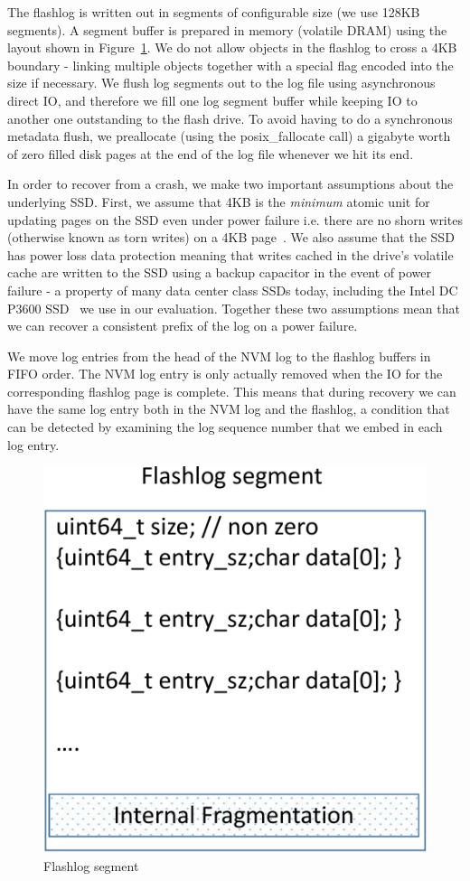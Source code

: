 \documentclass[pageno]{jpaper}
\begin{document}
The flashlog is written out in segments of configurable size (we use 128KB
segments). A segment buffer is prepared in memory (volatile DRAM) using the
layout shown in Figure~\ref{fig:flashlog_page}. We do not allow objects in the
flashlog to cross a 4KB boundary - linking multiple objects together with a
special flag encoded into the size if necessary. We flush log segments out to
the log file using asynchronous direct IO, and therefore we fill one log segment
buffer while keeping IO to another one outstanding to the flash drive. To avoid
having to do a synchronous metadata flush, we preallocate (using the
posix\_fallocate call) a gigabyte worth of zero filled disk pages at the end of
the log file whenever we hit its end.

In order to recover from a crash, we make two important assumptions about the
underlying SSD. First, we assume that 4KB is the \emph{minimum} atomic unit for
updating pages on the SSD even under power failure i.e. there are no shorn
writes (otherwise known as torn writes) on a 4KB page~\cite{shorn_writes}. We
also assume that the SSD has power loss data protection meaning that writes
cached in the drive's volatile cache are written to the SSD using a backup
capacitor in the event of power failure - a property of many data center class
SSDs today, including the Intel DC P3600 SSD~\cite{ssd_spec} we use in our
evaluation. Together these two assumptions mean that we can recover a consistent
prefix of the log on a power failure.

We move log entries from the head of the NVM log to the flashlog buffers in FIFO
order. The NVM log entry is only actually removed when the IO for the
corresponding flashlog page is complete. This means that during recovery we can
have the same log entry both in the NVM log and the flashlog, a condition that
can be detected by examining the log sequence number that we embed in each log
entry.

\begin{figure}
  \centering
  \includegraphics[scale=0.4]{figures2/flashlog_page.pdf}
  \caption{Flashlog segment}
  \label{fig:flashlog_page}
\end{figure}
\end{document}
